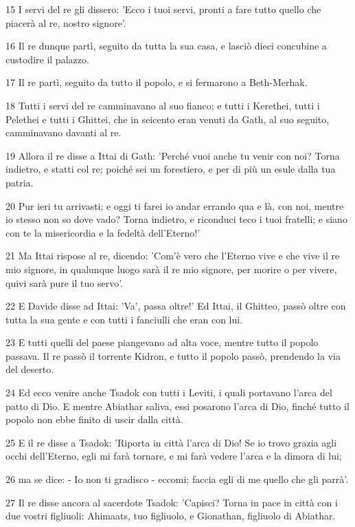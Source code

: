 \par 15 I servi del re gli dissero: 'Ecco i tuoi servi, pronti a fare tutto quello che piacerà al re, nostro signore'.
\par 16 Il re dunque partì, seguito da tutta la sua casa, e lasciò dieci concubine a custodire il palazzo.
\par 17 Il re partì, seguito da tutto il popolo, e si fermarono a Beth-Merhak.
\par 18 Tutti i servi del re camminavano al suo fianco; e tutti i Kerethei, tutti i Pelethei e tutti i Ghittei, che in seicento eran venuti da Gath, al suo seguito, camminavano davanti al re.
\par 19 Allora il re disse a Ittai di Gath: 'Perché vuoi anche tu venir con noi? Torna indietro, e statti col re; poiché sei un forestiero, e per di più un esule dalla tua patria.
\par 20 Pur ieri tu arrivasti; e oggi ti farei io andar errando qua e là, con noi, mentre io stesso non so dove vado? Torna indietro, e riconduci teco i tuoi fratelli; e siano con te la misericordia e la fedeltà dell'Eterno!'
\par 21 Ma Ittai rispose al re, dicendo: 'Com'è vero che l'Eterno vive e che vive il re mio signore, in qualunque luogo sarà il re mio signore, per morire o per vivere, quivi sarà pure il tuo servo'.
\par 22 E Davide disse ad Ittai: 'Va', passa oltre!' Ed Ittai, il Ghitteo, passò oltre con tutta la sua gente e con tutti i fanciulli che eran con lui.
\par 23 E tutti quelli del paese piangevano ad alta voce, mentre tutto il popolo passava. Il re passò il torrente Kidron, e tutto il popolo passò, prendendo la via del deserto.
\par 24 Ed ecco venire anche Tsadok con tutti i Leviti, i quali portavano l'arca del patto di Dio. E mentre Abiathar saliva, essi posarono l'arca di Dio, finché tutto il popolo non ebbe finito di uscir dalla città.
\par 25 E il re disse a Tsadok: 'Riporta in città l'arca di Dio! Se io trovo grazia agli occhi dell'Eterno, egli mi farà tornare, e mi farà vedere l'arca e la dimora di lui;
\par 26 ma se dice: - Io non ti gradisco - eccomi; faccia egli di me quello che gli parrà'.
\par 27 Il re disse ancora al sacerdote Tsadok: 'Capisci? Torna in pace in città con i due vostri figliuoli: Ahimaats, tuo figliuolo, e Gionathan, figliuolo di Abiathar.
